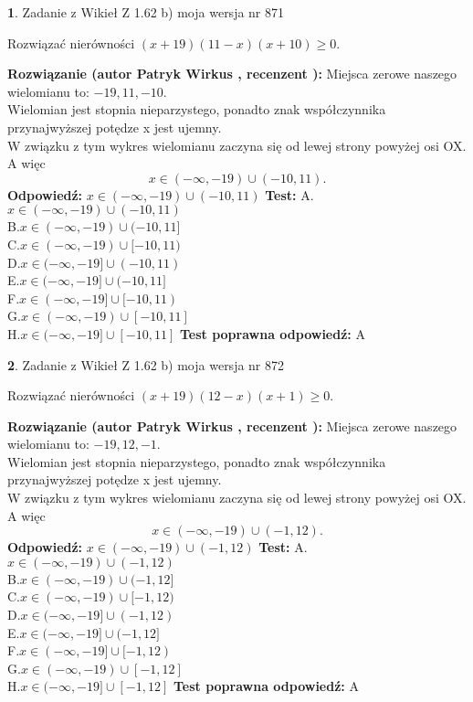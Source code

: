 \documentclass[12pt, a4paper]{article}
\theoremstyle{definition} %
\newtheorem{zad}{}
\newcommand{\zadStart}[1]{\begin{zad}#1\newline}
\newcommand{\zadStop}{\end{zad}}
\newcommand{\rozwStart}[2]{\noindent \textbf{Rozwiązanie (autor #1 , recenzent #2): }\newline}
\newcommand{\rozwStop}{\newline}
\newcommand{\odpStart}{\noindent \textbf{Odpowiedź:}\newline}
\newcommand{\odpStop}{\newline}
\newcommand{\testStart}{\noindent \textbf{Test:}\newline}
\newcommand{\testStop}{\newline}
\newcommand{\kluczStart}{\noindent \textbf{Test poprawna odpowiedź:}\newline}
\newcommand{\kluczStop}{\newline}
\begin{document}
\zadStart{Zadanie z Wikieł Z 1.62 b) moja wersja nr 871}

Rozwiązać nierówności $(x+19)(11-x)(x+10)\ge0$.
\zadStop
\rozwStart{Patryk Wirkus}{}
Miejsca zerowe naszego wielomianu to: $-19, 11, -10$.\\
Wielomian jest stopnia nieparzystego, ponadto znak współczynnika przy\linebreak najwyższej potędze x jest ujemny.\\ W związku z tym wykres wielomianu zaczyna się od lewej strony powyżej osi OX. A więc $$x \in (-\infty,-19) \cup (-10,11).$$
\rozwStop
\odpStart
$x \in (-\infty,-19) \cup (-10,11)$
\odpStop
\testStart
A.$x \in (-\infty,-19) \cup (-10,11)$\\
B.$x \in (-\infty,-19) \cup (-10,11]$\\
C.$x \in (-\infty,-19) \cup [-10,11)$\\
D.$x \in (-\infty,-19] \cup (-10,11)$\\
E.$x \in (-\infty,-19] \cup (-10,11]$\\
F.$x \in (-\infty,-19] \cup [-10,11)$\\
G.$x \in (-\infty,-19) \cup [-10,11]$\\
H.$x \in (-\infty,-19] \cup [-10,11]$
\testStop
\kluczStart
A
\kluczStop



\zadStart{Zadanie z Wikieł Z 1.62 b) moja wersja nr 872}

Rozwiązać nierówności $(x+19)(12-x)(x+1)\ge0$.
\zadStop
\rozwStart{Patryk Wirkus}{}
Miejsca zerowe naszego wielomianu to: $-19, 12, -1$.\\
Wielomian jest stopnia nieparzystego, ponadto znak współczynnika przy\linebreak najwyższej potędze x jest ujemny.\\ W związku z tym wykres wielomianu zaczyna się od lewej strony powyżej osi OX. A więc $$x \in (-\infty,-19) \cup (-1,12).$$
\rozwStop
\odpStart
$x \in (-\infty,-19) \cup (-1,12)$
\odpStop
\testStart
A.$x \in (-\infty,-19) \cup (-1,12)$\\
B.$x \in (-\infty,-19) \cup (-1,12]$\\
C.$x \in (-\infty,-19) \cup [-1,12)$\\
D.$x \in (-\infty,-19] \cup (-1,12)$\\
E.$x \in (-\infty,-19] \cup (-1,12]$\\
F.$x \in (-\infty,-19] \cup [-1,12)$\\
G.$x \in (-\infty,-19) \cup [-1,12]$\\
H.$x \in (-\infty,-19] \cup [-1,12]$
\testStop
\kluczStart
A
\kluczStop
\end{document}
